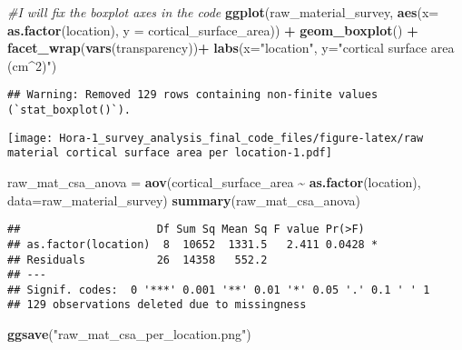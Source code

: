 \documentclass[
]{article}
\newenvironment{Shaded}{\begin{snugshade}}{\end{snugshade}}
\newcommand{\AttributeTok}[1]{\textcolor[rgb]{0.13,0.29,0.53}{#1}}
\newcommand{\CommentTok}[1]{\textcolor[rgb]{0.56,0.35,0.01}{\textit{#1}}}
\newcommand{\FunctionTok}[1]{\textcolor[rgb]{0.13,0.29,0.53}{\textbf{#1}}}
\newcommand{\NormalTok}[1]{#1}
\newcommand{\OtherTok}[1]{\textcolor[rgb]{0.56,0.35,0.01}{#1}}
\newcommand{\SpecialCharTok}[1]{\textcolor[rgb]{0.81,0.36,0.00}{\textbf{#1}}}
\newcommand{\StringTok}[1]{\textcolor[rgb]{0.31,0.60,0.02}{#1}}
\begin{document}
\begin{Shaded}
\begin{Highlighting}[]
\CommentTok{\#I will fix the boxplot axes in the code }
\FunctionTok{ggplot}\NormalTok{(raw\_material\_survey, }\FunctionTok{aes}\NormalTok{(}\AttributeTok{x=} \FunctionTok{as.factor}\NormalTok{(location), }\AttributeTok{y =}\NormalTok{ cortical\_surface\_area)) }\SpecialCharTok{+}
  \FunctionTok{geom\_boxplot}\NormalTok{() }\SpecialCharTok{+}
  \FunctionTok{facet\_wrap}\NormalTok{(}\FunctionTok{vars}\NormalTok{(transparency))}\SpecialCharTok{+}
  \FunctionTok{labs}\NormalTok{(}\AttributeTok{x=}\StringTok{"location"}\NormalTok{, }\AttributeTok{y=}\StringTok{"cortical surface area (cm\^{}2)"}\NormalTok{)}
\end{Highlighting}
\end{Shaded}

\begin{verbatim}
## Warning: Removed 129 rows containing non-finite values (`stat_boxplot()`).
\end{verbatim}

\texttt{[image: Hora-1\_survey\_analysis\_final\_code\_files/figure-latex/raw material cortical surface area per location-1.pdf]}

\begin{Shaded}
\begin{Highlighting}[]
\NormalTok{raw\_mat\_csa\_anova }\OtherTok{=} \FunctionTok{aov}\NormalTok{(cortical\_surface\_area }\SpecialCharTok{\textasciitilde{}} \FunctionTok{as.factor}\NormalTok{(location), }\AttributeTok{data=}\NormalTok{raw\_material\_survey)}
\FunctionTok{summary}\NormalTok{(raw\_mat\_csa\_anova)}
\end{Highlighting}
\end{Shaded}

\begin{verbatim}
##                     Df Sum Sq Mean Sq F value Pr(>F)  
## as.factor(location)  8  10652  1331.5   2.411 0.0428 *
## Residuals           26  14358   552.2                 
## ---
## Signif. codes:  0 '***' 0.001 '**' 0.01 '*' 0.05 '.' 0.1 ' ' 1
## 129 observations deleted due to missingness
\end{verbatim}

\begin{Shaded}
\begin{Highlighting}[]
\FunctionTok{ggsave}\NormalTok{(}\StringTok{"raw\_mat\_csa\_per\_location.png"}\NormalTok{)}
\end{Highlighting}
\end{Shaded}
\end{document}
